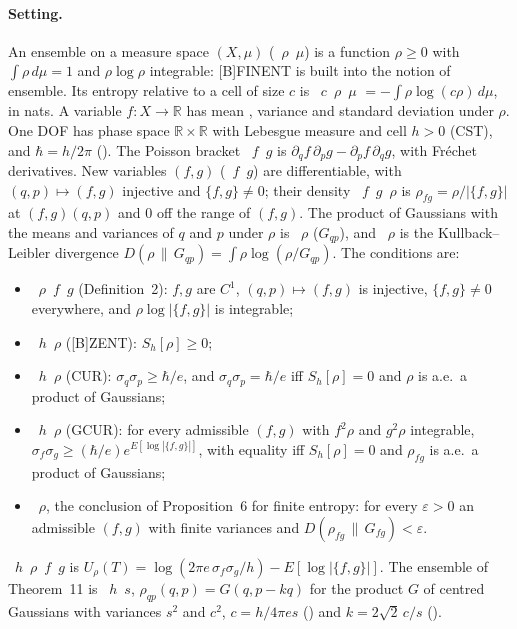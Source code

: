 \documentclass[11pt]{article}
\begin{document}
\paragraph{Setting.} An ensemble on a measure space $(X, \mu)$ (~$\rho$~$\mu$) is
a function $\rho \ge 0$ with $\int\rho\,d\mu = 1$ and $\rho\log\rho$ integrable: [B]FINENT is
built into the notion of ensemble. Its entropy relative to a cell of size $c$ is
~$c$~$\rho$~$\mu$ $= -\int\rho\log(c\rho)\,d\mu$, in nats. A variable
$f : X \to \mathbb R$ has mean , variance  and standard deviation 
under $\rho$. One DOF has phase space $\mathbb R \times \mathbb R$ with Lebesgue measure and cell
$h > 0$ (CST), and $\hbar = h/2\pi$ (). The Poisson bracket
~$f$~$g$ is $\partial_q f\,\partial_p g - \partial_p f\,\partial_q g$, with
Fréchet derivatives. New variables $(f, g)$ (~$f$~$g$) are differentiable,
with $(q, p) \mapsto (f, g)$ injective and $\{f, g\} \ne 0$; their density
~$f$~$g$~$\rho$ is $\rho_{fg} = \rho/|\{f, g\}|$ at $(f, g)(q, p)$ and $0$ off
the range of $(f, g)$. The product of Gaussians with the means and variances of $q$ and $p$ under
$\rho$ is ~$\rho$ ($G_{qp}$), and ~$\rho$ is the
Kullback--Leibler divergence $D(\rho\,\|\,G_{qp}) = \int\rho\log(\rho/G_{qp})$. The conditions
are:
\begin{itemize}
\item {}~$\rho$~$f$~$g$ (Definition~2): $f, g$ are $C^1$, $(q, p) \mapsto
  (f, g)$ is injective, $\{f, g\} \ne 0$ everywhere, and $\rho\log|\{f, g\}|$ is integrable;
\item {}~$h$~$\rho$ ([B]ZENT): $S_h[\rho] \ge 0$;
\item {}~$h$~$\rho$ (CUR): $\sigma_q\sigma_p \ge \hbar/e$, and
  $\sigma_q\sigma_p = \hbar/e$ iff $S_h[\rho] = 0$ and $\rho$ is a.e.\ a product of Gaussians;
\item {}~$h$~$\rho$ (GCUR): for every admissible $(f, g)$
  with $f^2\rho$ and $g^2\rho$ integrable, $\sigma_f\sigma_g \ge (\hbar/e)e^{E[\log|\{f,
  g\}|]}$, with equality iff $S_h[\rho] = 0$ and $\rho_{fg}$ is a.e.\ a product of Gaussians;
\item {}~$\rho$, the conclusion of Proposition~6 for finite entropy: for
  every $\varepsilon > 0$ an admissible $(f, g)$ with finite variances and
  $D(\rho_{fg}\,\|\,G_{fg}) < \varepsilon$.
\end{itemize}
~$h$~$\rho$~$f$~$g$ is
$U_\rho(T) = \log(2\pi e\,\sigma_f\sigma_g/h) - E[\log|\{f, g\}|]$. The ensemble of Theorem~11 is
~$h$~$s$, $\rho_{qp}(q, p) = G(q, p - kq)$ for the product $G$ of
centred Gaussians with variances $s^2$ and $c^2$, $c = h/4\pi e s$ () and
$k = 2\sqrt2\,c/s$ ().
\end{document}
